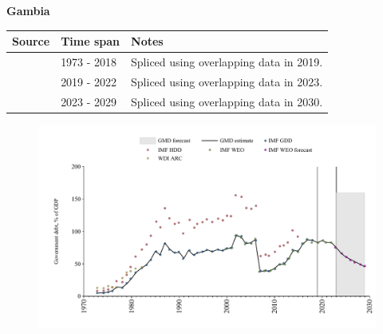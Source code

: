 \documentclass[12pt,a4paper,landscape]{article}
\begin{document}
\begin{adjustbox}{max totalsize={\paperwidth}{\paperheight},center}
\begin{minipage}[t][\textheight][t]{\textwidth}
\vspace*{0.5cm}
{}
\begin{center}
{\Large\bfseries Gambia}
\end{center}
\vspace{0.5cm}
\begin{table}[H]
\centering
\small
\begin{tabular}{|l|l|l|}
\hline
\textbf{Source} & \textbf{Time span} & \textbf{Notes} \\
\hline
\rowcolor{white}\cite{IMF_GDD}& 1973 - 2018 &Spliced using overlapping data in 2019.\\
\rowcolor{lightgray}\cite{IMF_WEO}& 2019 - 2022 &Spliced using overlapping data in 2023.\\
\rowcolor{white}\cite{IMF_WEO_forecast}& 2023 - 2029 &Spliced using overlapping data in 2030.\\
\hline
\end{tabular}
\end{table}
\begin{figure}[H]
\centering
\includegraphics[width=\textwidth,height=0.6\textheight,keepaspectratio]{graphs/GMB_govdebt_GDP.pdf}
\end{figure}
\end{minipage}
\end{adjustbox}
\end{document}
